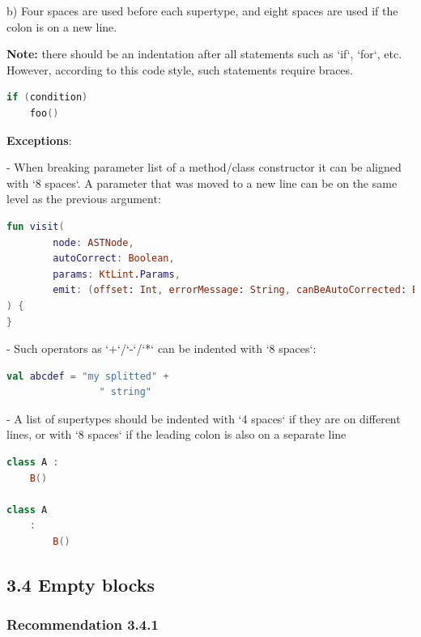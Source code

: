 b) Four spaces are used before each supertype, and eight spaces are used if the colon is on a new line.



\textbf{Note:} there should be an indentation after all statements such as `if`, `for`, etc. However, according to this code style, such statements require braces.



\begin{lstlisting}[language=Kotlin]
if (condition)
    foo()
\end{lstlisting}


\textbf{Exceptions}:

- When breaking parameter list of a method/class constructor it can be aligned with `8 spaces`. A parameter that was moved to a new line can be on the same level as the previous argument:



\begin{lstlisting}[language=Kotlin]
fun visit(
        node: ASTNode,
        autoCorrect: Boolean,
        params: KtLint.Params,
        emit: (offset: Int, errorMessage: String, canBeAutoCorrected: Boolean) -> Unit
) {
}
\end{lstlisting}


- Such operators as `+`/`-`/`*` can be indented with `8 spaces`:



\begin{lstlisting}[language=Kotlin]
val abcdef = "my splitted" +
                " string"
\end{lstlisting}


- A list of supertypes should be indented with `4 spaces` if they are on different lines, or with `8 spaces` if the leading colon is also on a separate line



\begin{lstlisting}[language=Kotlin]
class A :
    B()

class A
    :
        B()
\end{lstlisting}


\subsection*{\textbf{3.4 Empty blocks}}

\subsubsection*{\textbf{Recommendation 3.4.1}}
\leavevmode\newline



